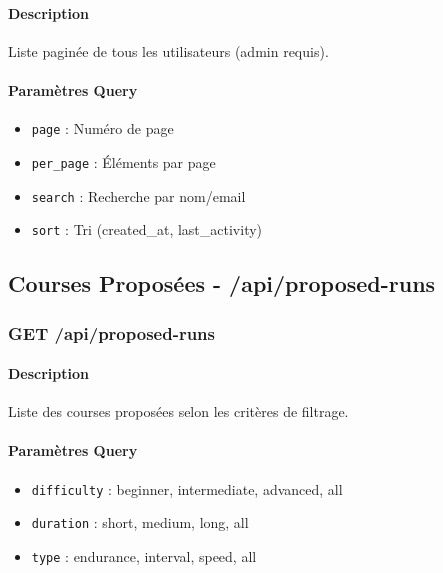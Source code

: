 \paragraph{Description}
Liste paginée de tous les utilisateurs (admin requis).

\paragraph{Paramètres Query}
\begin{itemize}
    \item \texttt{page} : Numéro de page
    \item \texttt{per\_page} : Éléments par page
    \item \texttt{search} : Recherche par nom/email
    \item \texttt{sort} : Tri (created\_at, last\_activity)
\end{itemize}

\subsection{Courses Proposées - /api/proposed-runs}

\subsubsection{GET /api/proposed-runs}

\paragraph{Description}
Liste des courses proposées selon les critères de filtrage.

\paragraph{Paramètres Query}
\begin{itemize}
    \item \texttt{difficulty} : beginner, intermediate, advanced, all
    \item \texttt{duration} : short, medium, long, all
    \item \texttt{type} : endurance, interval, speed, all
\end{itemize}

